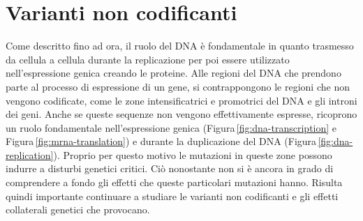 \section{Varianti non codificanti}

Come descritto fino ad ora, il ruolo del DNA è fondamentale in quanto trasmesso da cellula a cellula durante la replicazione per poi essere utilizzato nell'espressione genica creando le proteine. Alle regioni del DNA che prendono parte al processo di espressione di un gene, si contrappongono le regioni che non vengono codificate, come le zone intensificatrici e promotrici del DNA e gli introni dei geni. Anche se queste sequenze non vengono effettivamente espresse, ricoprono un ruolo fondamentale nell'espressione genica (Figura\,\ref{fig:dna-transcription} e Figura\,\ref{fig:mrna-translation}) e durante la duplicazione del DNA (Figura\,\ref{fig:dna-replication}). Proprio per questo motivo le mutazioni in queste zone possono indurre a disturbi genetici critici. Ciò nonostante non si è ancora in grado di comprendere a fondo gli effetti che queste particolari mutazioni hanno. Risulta quindi importante continuare a studiare le varianti non codificanti e gli effetti collaterali genetici che provocano.


